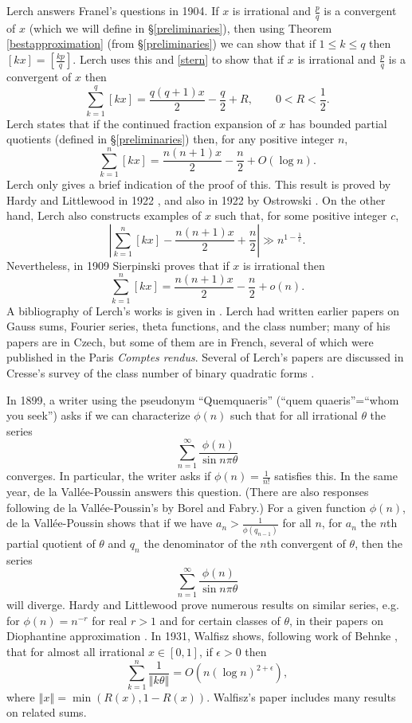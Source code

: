 \documentclass{amsart}
\newcommand{\norm}[1]{\left\Vert #1 \right\Vert}
\begin{document}
Lerch \cite{lerch} answers Franel's questions in 1904. If $x$ is irrational and
$\frac{p}{q}$ is a convergent of $x$ (which we will define in \S \ref{preliminaries}), then using 
Theorem \ref{bestapproximation} (from \S \ref{preliminaries}) we can show that if $1 \leq k \leq q$ then $[k x]=[\frac{k p}{q}]$.
Lerch uses this and \eqref{stern} to show that if $x$ is irrational and $\frac{p}{q}$ is a convergent of $x$ then
\[
\sum_{k=1}^q [k x]=\frac{q(q+1)x}{2}-\frac{q}{2}+R, \qquad 0<R<\frac{1}{2}.
\]
Lerch states that if the continued fraction expansion of $x$ has bounded partial quotients (defined in \S \ref{preliminaries}) then, for any positive integer $n$,
\[
\sum_{k=1}^n [kx]=\frac{n(n+1)x}{2}-\frac{n}{2}+O(\log n).
\]
Lerch only gives a brief indication of the proof of this. This result is proved by Hardy and Littlewood in 1922 \cite[p.~24, Theorem B3]{latticeI},
and also in 1922 by Ostrowski \cite[p.~81]{ostrowski1922}.
On the other hand, Lerch also constructs examples of $x$ such that, for some positive integer $c$,
\[
\left| \sum_{k=1}^n [kx]-\frac{n(n+1)x}{2}+\frac{n}{2} \right| \gg n^{1-\frac{1}{c}}.
\]
Nevertheless, in 1909 Sierpinski \cite{sierpinski} proves that if $x$ is irrational then
\[
\sum_{k=1}^n [kx]=\frac{n(n+1)x}{2}-\frac{n}{2}+o(n).
\] 
A bibliography of Lerch's works is given in \cite{skrasek}. Lerch had written
earlier papers on Gauss sums, Fourier series, theta functions, and the class number; many of his papers are in Czech, but some of them are in French, several of which
were published in the Paris {\em Comptes rendus}.
Several of Lerch's papers are discussed in Cresse's survey  of the class number of binary quadratic forms \cite[Chapter VI]{dicksonIII}.


In 1899, a writer using the pseudonym ``Quemquaeris''  \cite{quemquaeris} (``quem quaeris''=``whom you seek'') asks if we can characterize $\phi(n)$ such that for
all  irrational $\theta$
the series
\[
\sum_{n=1}^\infty \frac{\phi(n)}{\sin n\pi \theta}
\]
converges.
 In particular, the writer asks if $\phi(n)=\frac{1}{n!}$ satisfies this. In the same year, de la Vall\'ee-Poussin \cite{valleepoussin}
answers this question. (There are also responses following de la Vall\'ee-Poussin's by Borel and Fabry.) For a given function $\phi(n)$,
de la Vall\'ee-Poussin shows that if we have $a_n>\frac{1}{\phi(q_{n-1})}$ for all $n$,  for $a_n$ the $n$th partial quotient of $\theta$ and $q_n$ the denominator of the $n$th convergent of $\theta$,
then the series
\[
\sum_{n=1}^\infty \frac{\phi(n)}{\sin n\pi \theta}
\]
will diverge. Hardy and Littlewood prove numerous results on similar series, e.g. for $\phi(n)=n^{-r}$ for real $r>1$ and for certain classes of $\theta$, in their papers on Diophantine approximation \cite{collectedpapers}. 
In 1931, Walfisz  \cite[p.~570, Hilfssatz 4]{walfisz} shows, following work of Behnke \cite[p.~289, \S 16]{behnke1924}, that for almost all irrational $x\in [0,1]$, if $\epsilon>0$ then
\[
\sum_{k=1}^n \frac{1}{\norm{k\theta}} = O(n (\log n)^{2+\epsilon}),
\]
where $\norm{x}=\min(R(x),1-R(x))$.
Walfisz's paper includes many results on related sums.
\end{document}
